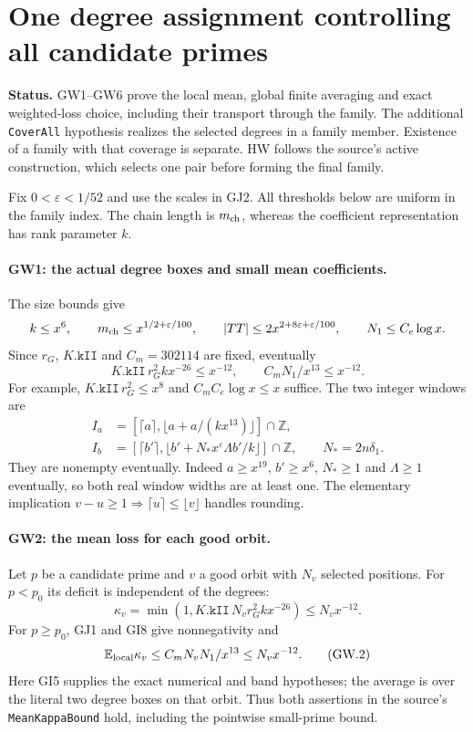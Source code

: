 \section{One degree assignment controlling all candidate primes}
\label{sec:global-weight-choice}

\noindent\textbf{Status.}
GW1--GW6 prove the local mean, global finite averaging and exact
weighted-loss choice, including their transport through the family.
The additional \texttt{CoverAll} hypothesis
realizes the selected degrees in a family member. Existence of a
family with that coverage is separate. HW follows the source's active
construction, which selects one pair before forming the final family.

Fix $0<\varepsilon<1/52$ and use the scales in GJ2. All thresholds
below are uniform in the family index. The chain length is $m_{\rm ch}$,
whereas the coefficient representation has rank parameter $k$.

\paragraph{GW1: the actual degree boxes and small mean coefficients.}
The size bounds give
\[
 k\le x^6,\qquad m_{\rm ch}\le x^{1/2+\varepsilon/100},\qquad
 |TT|\le2x^{2+8\varepsilon+\varepsilon/100},\qquad
 N_1\le C_e\log x.
\]
Since $r_G$, $K.\texttt{kII}$ and $C_m=302114$ are fixed, eventually
\[
 K.\texttt{kII}\,r_G^2 kx^{-26}\le x^{-12},\qquad
 C_mN_1/x^{13}\le x^{-12}.                         \tag{GW.1}
\]
For example, $K.\texttt{kII}\,r_G^2\le x^8$ and
$C_m C_e\log x\le x$ suffice. The two integer windows are
\begin{align*}
 I_a&=[\lceil a\rceil,\lfloor a+a/(kx^{13})\rfloor]\cap\mathbb Z,\\
 I_b&=[\lceil b'\rceil,
       \lfloor b'+N_*x^\varepsilon\Lambda b'/k\rfloor]\cap\mathbb Z,
 \qquad N_*=2n\delta_1.
\end{align*}
They are nonempty eventually. Indeed $a\ge x^{19}$,
$b'\ge x^6$, $N_*\ge1$ and $\Lambda\ge1$ eventually, so both real
window widths are at least one. The elementary implication
$v-u\ge1\Rightarrow\lceil u\rceil\le\lfloor v\rfloor$ handles rounding.

\paragraph{GW2: the mean loss for each good orbit.}
Let $p$ be a candidate prime and $v$ a good orbit with $N_v$ selected
positions. For $p<p_0$ its deficit is independent of the degrees:
\[
 \kappa_v=\min(1,K.\texttt{kII}\,N_vr_G^2kx^{-26})
 \le N_vx^{-12}.
\]
For $p\ge p_0$, GJ1 and GI8 give nonnegativity and
\[
 \mathbb E_{\rm local}\kappa_v
 \le C_mN_vN_1/x^{13}\le N_vx^{-12}.                 \tag{GW.2}
\]
Here GI5 supplies the exact numerical and band hypotheses; the
average is over the literal two degree boxes on that orbit. Thus
both assertions in the source's \texttt{MeanKappaBound} hold, including
the pointwise small-prime bound.

